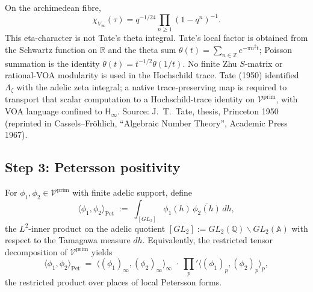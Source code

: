 \begin{remark}
\label{v4-arith:w5-direct:rem:P2-elementary}
On the archimedean fibre,
\[
\chi_{V_{\infty}}(\tau)=q^{-1/24}\prod_{n\geq1}(1-q^{n})^{-1}.
\]
This eta-character is not Tate's theta integral.  Tate's local factor is
obtained from the Schwartz function on \(\mathbb{R}\) and the theta sum
\(\theta(t)=\sum_{n\in\mathbb{Z}}e^{-\pi n^{2}t}\); Poisson summation is
the identity \(\theta(t)=t^{-1/2}\theta(1/t)\).  No finite Zhu
\(S\)-matrix or rational-VOA modularity is used in the Hochschild trace.
Tate (1950) identified \(\Lambda_{\zeta}\) with the adelic zeta integral;
a native trace-preserving map is required to transport that scalar computation to a Hochschild-trace
identity on \(\mathcal{V}^{\mathrm{prim}}\), with VOA language confined
to \(\mathsf{H}_{\infty}\). Source: J.~T.~Tate, thesis, Princeton 1950
(reprinted in Cassels--Fr\"{o}hlich, ``Algebraic Number Theory'',
Academic Press 1967).
\end{remark}

\subsection{Step 3: Petersson positivity}
\label{v4-arith:w5-direct:step-3}

\begin{definition}
\label{v4-arith:w5-direct:def:petersson}
For \(\phi_{1},\phi_{2}\in\mathcal{V}^{\mathrm{prim}}\) with finite
adelic support, define
\begin{equation}
\label{v4-arith:w5-direct:eq:petersson}
\langle \phi_{1},\phi_{2}\rangle_{\mathrm{Pet}}\;:=\;
\int_{[GL_{2}]}\phi_{1}(h)\,\overline{\phi_{2}(h)}\,dh,
\end{equation}
the \(L^{2}\)-inner product on the adelic quotient
\([GL_{2}]:=GL_{2}(\mathbb{Q})\backslash GL_{2}(\mathbb{A})\) with
respect to the Tamagawa measure \(dh\). Equivalently, the restricted tensor
decomposition of \(\mathcal{V}^{\mathrm{prim}}\) yields
\begin{equation}
\label{v4-arith:w5-direct:eq:petersson-factorized}
\langle \phi_{1},\phi_{2}\rangle_{\mathrm{Pet}}\;=\;
\langle (\phi_{1})_{\infty},(\phi_{2})_{\infty}\rangle_{\infty}
\;\cdot\;{\prod_{p}}'\langle (\phi_{1})_{p},(\phi_{2})_{p}\rangle_{p},
\end{equation}
the restricted product over places of local Petersson forms.
\end{definition}

